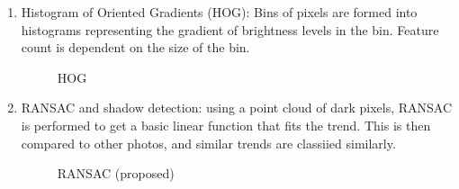 \documentclass{article}
\begin{document}
\begin{enumerate}[1.]
\item Histogram of Oriented Gradients (HOG): Bins of pixels are formed into histograms representing the gradient of brightness levels in the bin. Feature count is dependent on the size of the bin. 
\begin{figure}[H]
\centering
\setlength\fboxsep{2pt}
\setlength\fboxrule{0pt}
\caption{
HOG
}
\end{figure}

\item RANSAC and shadow detection: using a point cloud of dark pixels, RANSAC is performed to get a basic linear function that fits the trend. This is then compared to other photos, and similar trends are classiied similarly.
\begin{figure}[H]
\centering
\setlength\fboxsep{2pt}
\setlength\fboxrule{0pt}
\caption{
RANSAC (proposed)
}
\end{figure}

\end{enumerate}
\end{document}

